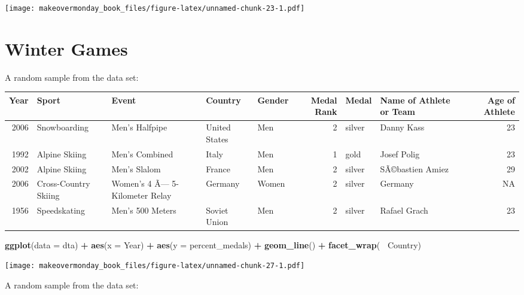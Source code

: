 \documentclass[]{book}
\newenvironment{Shaded}{\begin{snugshade}}{\end{snugshade}}
\newcommand{\KeywordTok}[1]{\textcolor[rgb]{0.13,0.29,0.53}{\textbf{#1}}}
\newcommand{\DataTypeTok}[1]{\textcolor[rgb]{0.13,0.29,0.53}{#1}}
\newcommand{\StringTok}[1]{\textcolor[rgb]{0.31,0.60,0.02}{#1}}
\newcommand{\OperatorTok}[1]{\textcolor[rgb]{0.81,0.36,0.00}{\textbf{#1}}}
\newcommand{\NormalTok}[1]{#1}
\theoremstyle{definition}
\theoremstyle{definition}
\theoremstyle{definition}
\theoremstyle{remark}
\begin{document}
\texttt{[image: makeovermonday\_book\_files/figure-latex/unnamed-chunk-23-1.pdf]}

\chapter{Winter Games}\label{winter-games}

A random sample from the data set:

\begin{tabular}{r|l|l|l|l|r|l|l|r}
\hline
Year & Sport & Event & Country & Gender & Medal Rank & Medal & Name of Athlete or Team & Age of Athlete\\
\hline
2006 & Snowboarding & Men's Halfpipe & United States & Men & 2 & silver & Danny Kass & 23\\
\hline
1992 & Alpine Skiing & Men's Combined & Italy & Men & 1 & gold & Josef Polig & 23\\
\hline
2002 & Alpine Skiing & Men's Slalom & France & Men & 2 & silver & SÃ©bastien Amiez & 29\\
\hline
2006 & Cross-Country Skiing & Women's 4 Ã— 5-Kilometer Relay & Germany & Women & 2 & silver & Germany & NA\\
\hline
1956 & Speedskating & Men's 500 Meters & Soviet Union & Men & 2 & silver & Rafael Grach & 23\\
\hline
\end{tabular}

\begin{Shaded}
\begin{Highlighting}[]
\KeywordTok{ggplot}\NormalTok{(}\DataTypeTok{data =}\NormalTok{ dta) }\OperatorTok{+}\StringTok{ }
\StringTok{  }\KeywordTok{aes}\NormalTok{(}\DataTypeTok{x =}\NormalTok{ Year) }\OperatorTok{+}
\StringTok{  }\KeywordTok{aes}\NormalTok{(}\DataTypeTok{y =}\NormalTok{ percent_medals) }\OperatorTok{+}
\StringTok{  }\KeywordTok{geom_line}\NormalTok{() }\OperatorTok{+}\StringTok{ }
\StringTok{  }\KeywordTok{facet_wrap}\NormalTok{(}\OperatorTok{~}\StringTok{ }\NormalTok{Country)}
\end{Highlighting}
\end{Shaded}

\texttt{[image: makeovermonday\_book\_files/figure-latex/unnamed-chunk-27-1.pdf]}

A random sample from the data set:
\end{document}
